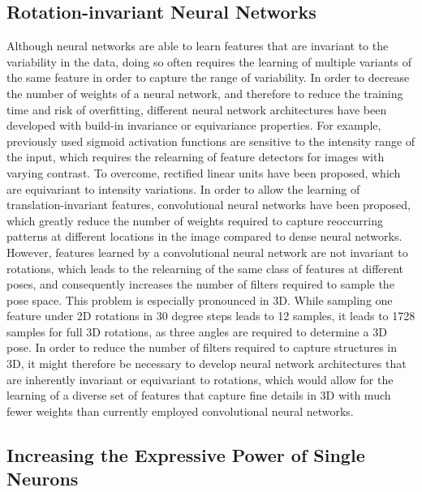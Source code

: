 \subsection[Rotation-invariant neural networks]{Rotation-invariant Neural
Networks}

Although neural networks are able to learn features that are invariant to the
variability in the data, doing so often requires the learning of multiple
variants of the same feature in order to capture the range of variability. In
order to decrease the number of weights of a neural network, and therefore to
reduce the training time and risk of overfitting, different neural network
architectures have been developed with build-in invariance or equivariance
properties. For example, previously used sigmoid activation functions are
sensitive to the intensity range of the input, which requires the relearning of
feature detectors for images with varying contrast. To overcome, rectified
linear units have been proposed, which are equivariant to intensity variations.
In order to allow the learning of translation-invariant features, convolutional
neural networks have been proposed, which greatly reduce the number of weights
required to capture reoccurring patterns at different locations in the image
compared to dense neural networks. However, features learned by a convolutional
neural network are not invariant to rotations, which leads to the relearning of
the same class of features at different poses, and consequently increases the
number of filters required to sample the pose space. This problem is especially
pronounced in 3D. While sampling one feature under 2D rotations in 30 degree
steps leads to 12 samples, it leads to 1728 samples for full 3D rotations, as
three angles are required to determine a 3D pose. In order to reduce the number
of filters required to capture structures in 3D, it might therefore be
necessary to develop neural network architectures that are inherently invariant
or equivariant to rotations, which would allow for the learning of a diverse set
of features that capture fine details in 3D with much fewer weights than
currently employed convolutional neural networks.

\subsection[Increasing the expressive power of single neurons]{Increasing the
Expressive Power of Single Neurons}

